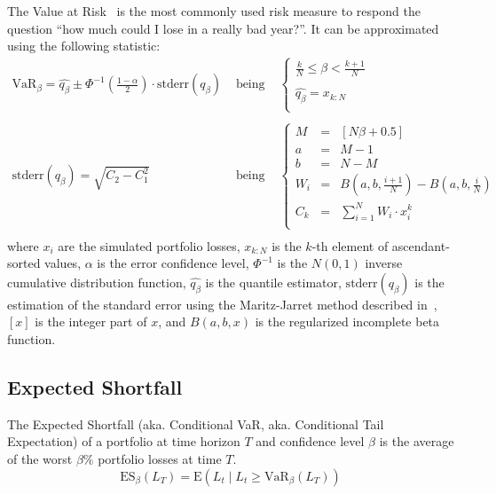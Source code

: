 \documentclass[11pt,fleqn]{book} %
\begin{document}
The Value at Risk~\cite{var:jorion} is the most commonly 
used risk measure to respond the question \enquote{how much could I lose in a 
really bad year?}. It can be approximated using the following statistic:
\begin{displaymath}
	\begin{array}{lcl}
		\textrm{VaR}_{\beta} = \widehat{q_{\beta}} \pm \Phi^{-1}\left(\frac{1-\alpha}{2}\right) \cdot \textrm{stderr}(q_{\beta})
		& \text{ being } &
		\left\{
		\begin{array}{l}
			\displaystyle
			\frac{k}{N} \leq \beta < \frac{k+1}{N} \\
			\\
			\displaystyle
			\widehat{q_{\beta}} = x_{k:N} \\
		\end{array}
		\right.
		\\
		& &
		\\
		\textrm{stderr}(q_{\beta}) = \sqrt{C_2 - C_1^2}
		& \text{ being } &
		\left\{
		\begin{array}{rcl}
			M   & = & [N \beta + 0.5]  \\
			a   & = & M - 1            \\
			b   & = & N - M            \\
			W_i & = & B(a,b,\frac{i+1}{N}) - B(a,b,\frac{i}{N}) \\
			C_k & = & \sum_{i=1}^{N} W_i \cdot x_i^k \\
		\end{array}
		\right.
		\\
	\end{array}
\end{displaymath}
where $x_i$ are the simulated portfolio losses, $x_{k:N}$ is the $k$-th 
element of ascendant-sorted values, $\alpha$ is the error confidence level, 
$\Phi^{-1}$ is the $N(0,1)$ inverse cumulative distribution function, 
$\widehat{q_{\beta}}$ is the quantile estimator, $\textrm{stderr}(q_{\beta})$ 
is the estimation of the standard error using the Maritz-Jarret method 
described in~\cite{quant:algor}, $[x]$ is the integer part of $x$, and 
$B(a,b,x)$ is the regularized incomplete beta function.

\subsection{Expected Shortfall}

\begin{definition}
	The Expected Shortfall (aka. Conditional VaR, aka. Conditional Tail 
	Expectation) of a portfolio at time horizon $T$ and 
	confidence level $\beta$ is the average of the worst $\beta\%$ portfolio 
	losses at time $T$.
	\begin{displaymath}
		\text{ES}_\beta(L_T) = \text{E}(L_t \mid L_t \ge \text{VaR}_\beta(L_T))
	\end{displaymath}
\end{definition}
\end{document}
